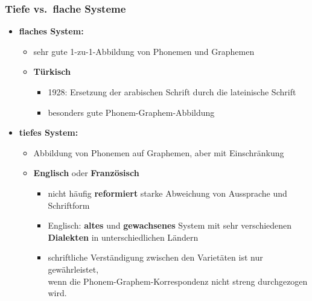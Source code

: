 \begin{frame}
\frametitle{Tiefe vs.\ flache Systeme}
\begin{itemize}
	
	\item \textbf{flaches System:}

	\begin{itemize}
		
		\item sehr gute 1-zu-1-Abbildung von Phonemen und Graphemen
		
		\item \textbf{Türkisch}
		
		\begin{itemize}
			
			\item 1928: Ersetzung der arabischen Schrift durch die lateinische Schrift
			
			\item besonders gute Phonem-Graphem-Abbildung
		\end{itemize}
	\end{itemize}

\pause 

	\item \textbf{tiefes System:}

\begin{itemize}

	\item Abbildung von Phonemen auf Graphemen, aber mit Einschränkung

	\item \textbf{Englisch} oder \textbf{Französisch}
	
	\begin{itemize}
		\item nicht häufig \textbf{reformiert} \ras starke Abweichung von Aussprache und Schriftform

		\item Englisch: \textbf{altes} und \textbf{gewachsenes} System mit sehr verschiedenen \textbf{Dialekten} in unterschiedlichen Ländern

		\item schriftliche Verständigung zwischen den Varietäten ist nur gewährleistet,\\
		wenn die Phonem-Graphem-Korrespondenz nicht streng durchgezogen wird.
	\end{itemize}
\end{itemize}
\end{itemize}

\end{frame}


